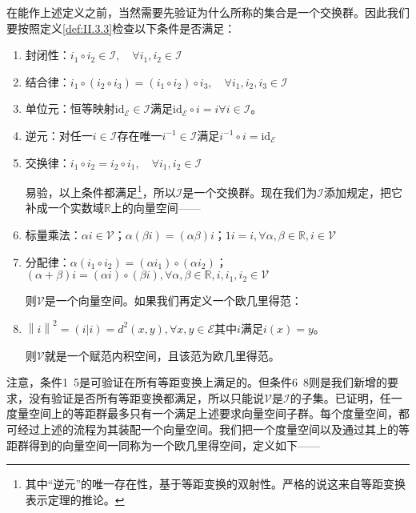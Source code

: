 \documentclass[main.tex]{subfiles}
\begin{document}
在能作上述定义之前，当然需要先验证为什么所称的集合是一个交换群。因此我们要按照定义\ref{def:II.3.3}检查以下条件是否满足：
\begin{enumerate}
    \item 封闭性：$i_1\circ i_2\in\mathcal{I},\quad\forall i_1,i_2\in\mathcal{I}$
    \item 结合律：$i_1\circ \left(i_2\circ i_3\right)=\left(i_1\circ i_2\right)\circ i_3,\quad\forall i_1,i_2,i_3\in\mathcal{I}$
    \item 单位元：恒等映射$\mathrm{id}_\mathcal{E}\in\mathcal{I}$满足$\mathrm{id}_\mathcal{E}\circ i=i\forall i\in\mathcal{I}$。
    \item 逆元：对任一$i\in\mathcal{I}$存在唯一$i^{-1}\in\mathcal{I}$满足$i^{-1}\circ i=\mathrm{id}_\mathcal{E}$
    \item 交换律：$i_1\circ i_2=i_2\circ i_1,\quad\forall i_1,i_2\in\mathcal{I}$

          易验，以上条件都满足\footnote{其中“逆元”的唯一存在性，基于等距变换的双射性。严格的说这来自等距变换表示定理的推论。}，所以$\mathcal{I}$是一个交换群。现在我们为$\mathcal{I}$添加规定，把它补成一个实数域$\mathbb{R}$上的向量空间——

    \item 标量乘法：$\alpha i\in\mathcal{V}$；$\alpha\left(\beta i\right)=\left(\alpha\beta\right)i$；$1i=i,\forall\alpha,\beta\in\mathbb{R},i\in\mathcal{V}$
    \item 分配律：$\alpha\left(i_1\circ i_2\right)=\left(\alpha i_1\right)\circ\left(\alpha i_2\right)$；$\left(\alpha+\beta\right)i=\left(\alpha i\right)\circ\left(\beta i\right),\forall\alpha,\beta\in\mathbb{R},i,i_1,i_2\in\mathcal{V}$

          则$\mathcal{V}$是一个向量空间。如果我们再定义一个欧几里得范：

    \item $\left\|i\right\|^2=\left(i|i\right)= d^2\left(x,y\right),\forall x,y\in\mathcal{E}$其中$i$满足$i\left(x\right)=y$。

          则$\mathcal{V}$就是一个赋范内积空间，且该范为欧几里得范。
\end{enumerate}


注意，条件1~5是可验证在所有等距变换上满足的。但条件6~8则是我们新增的要求，没有验证是否所有等距变换都满足，所以只能说$\mathcal{V}$是$\mathcal{I}$的子集。已证明，任一度量空间上的等距群最多只有一个满足上述要求向量空间子群\cite{Noll1974}。每个度量空间，都可经过上述的流程为其装配一个向量空间。我们把一个度量空间以及通过其上的等距群得到的向量空间一同称为一个欧几里得空间，定义如下——
\end{document}
